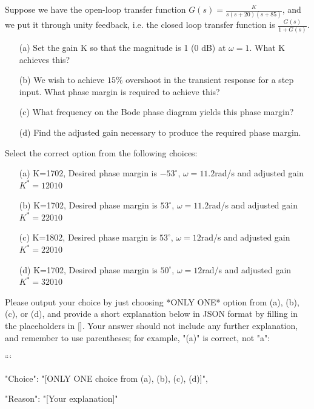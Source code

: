 \documentclass[12pt]{article}
\begin{document}
Suppose we have the open-loop transfer function $G(s) = \frac{K}{s(s + 20)(s + 85)}$, and we put it through unity feedback, i.e. the closed loop transfer function is $\frac{G(s)}{
1 + G(s)}$.
\begin{enumerate}
    \item [(a)] Set the gain K so that the magnitude is 1 (0 dB) at $\omega=1$. What K achieves
this?
\item[(b)] We wish to achieve $15\%$ overshoot in the transient response for a step input. What phase
margin is required to achieve this?
\item[(c)] What frequency on the Bode phase diagram yields this phase margin?
\item[(d)] Find the adjusted gain necessary to produce the required phase margin.
\end{enumerate}


Select the correct option from the following choices:
\begin{enumerate}
    \item [(a)] K=1702, Desired phase margin is $-53^\circ$, $\omega =11.2 $rad/s and adjusted gain $K^*=12010$
    \item [(b)] K=1702, Desired phase margin is $53^\circ$, $\omega =11.2 $rad/s and adjusted gain $K^*=22010$
    \item [(c)]  K=1802, Desired phase margin is $53^\circ$, $\omega =12 $rad/s and adjusted gain $K^*=22010$
    \item [(d)]  K=1702, Desired phase margin is $50^\circ$, $\omega =12 $rad/s and adjusted gain $K^*=32010$
\end{enumerate}

Please output your choice by just choosing *ONLY ONE* option from (a), (b), (c), or (d), and provide a short explanation below in JSON format by filling in the placeholders in []. Your answer should not include any further explanation, and remember to use parentheses; for example, "(a)" is correct, not "a": 

```
{

"Choice": "[ONLY ONE choice from (a), (b), (c), (d)]",

"Reason": "[Your explanation]"

}
\end{document}
